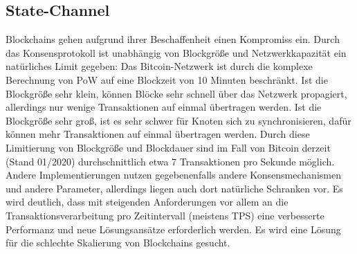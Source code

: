 \subsection{State-Channel}
\label{subsec:fundamentals:dlt:scaling}
Blockchains gehen aufgrund ihrer Beschaffenheit einen Kompromiss ein. Durch das Konsensprotokoll ist unabhängig von Blockgröße und Netzwerkkapazität ein natürliches Limit gegeben: Das Bitcoin-Netzwerk ist durch die komplexe Berechnung von \ac{PoW} auf eine Blockzeit von 10 Minuten beschränkt. Ist die Blockgröße sehr klein, können Blöcke sehr schnell über das Netzwerk propagiert, allerdings nur wenige Transaktionen auf einmal übertragen werden. Ist die Blockgröße sehr groß, ist es sehr schwer für Knoten sich zu synchronisieren, dafür können mehr Transaktionen auf einmal übertragen werden. Durch diese Limitierung von Blockgröße und Blockdauer sind im Fall von Bitcoin derzeit (Stand 01/2020) durchschnittlich etwa 7 Transaktionen pro Sekunde möglich. Andere Implementierungen nutzen gegebenenfalls andere Konsensmechanismen und andere Parameter, allerdings liegen auch dort natürliche Schranken vor. Es wird deutlich, dass mit steigenden Anforderungen vor allem an die Transaktionsverarbeitung pro Zeitintervall \cite{Macdonald2017} (meistens \ac{TPS}) eine verbesserte Performanz und neue Lösungsansätze erforderlich werden. Es wird eine Lösung für die schlechte Skalierung von Blockchains gesucht.\\

